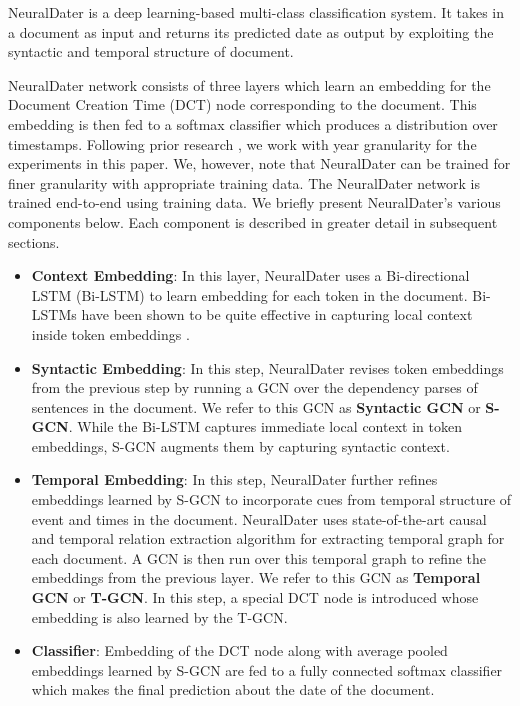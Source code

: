 \documentclass[11pt,a4paper]{article}
\newcommand{\method}{NeuralDater}
\begin{document}
\method{} is a deep learning-based multi-class classification system. It takes in a document as input and returns its predicted date as output by exploiting the syntactic and temporal structure of document. 

\method{} network consists of three layers which learn an  embedding for the Document Creation Time (DCT) node corresponding to the document. This embedding is then fed to a softmax classifier which produces a distribution over timestamps. Following prior research \cite{Chambers:2012:LDT:2390524.2390539,Kotsakos:2014:BAD:2600428.2609495}, we work with year granularity for the experiments in this paper.  We, however, note that NeuralDater can be trained for finer granularity with appropriate training data. The \method{} network is trained end-to-end using training data. We briefly present \method{}'s various components below. Each component is described in greater detail in subsequent sections.

\begin{itemize}
	\item \textbf{Context Embedding}: In this layer, \method{} uses a Bi-directional LSTM (Bi-LSTM) to learn embedding for each token in the document. Bi-LSTMs have been shown to be quite effective in capturing local context inside token embeddings \cite{Sutskever:2014:SSL:2969033.2969173}.
	\item \textbf{Syntactic Embedding}: In this step, \method{} revises token embeddings from the previous step by running a GCN over the dependency parses of sentences in the document. We refer to this GCN as \textbf{Syntactic GCN} or \textbf{S-GCN}. While the Bi-LSTM captures immediate local context in token embeddings, S-GCN augments them by capturing syntactic context. 
	\item \textbf{Temporal Embedding}: In this step, \method{} further refines embeddings learned by S-GCN to incorporate cues from temporal structure of event and times in the document. \method{} uses state-of-the-art causal and temporal relation extraction algorithm \cite{catena_paper} for extracting temporal graph for each document. A GCN is then run over this temporal graph to refine the embeddings from the previous layer. We refer to this GCN as \textbf{Temporal GCN} or \textbf{T-GCN}. In this step, a special DCT node is introduced whose embedding is also learned by the T-GCN.
	\item \textbf{Classifier}: Embedding of the DCT node along with average pooled embeddings learned by S-GCN are fed to a fully connected softmax classifier which makes the final prediction about the date of the document.
\end{itemize}
\end{document}
